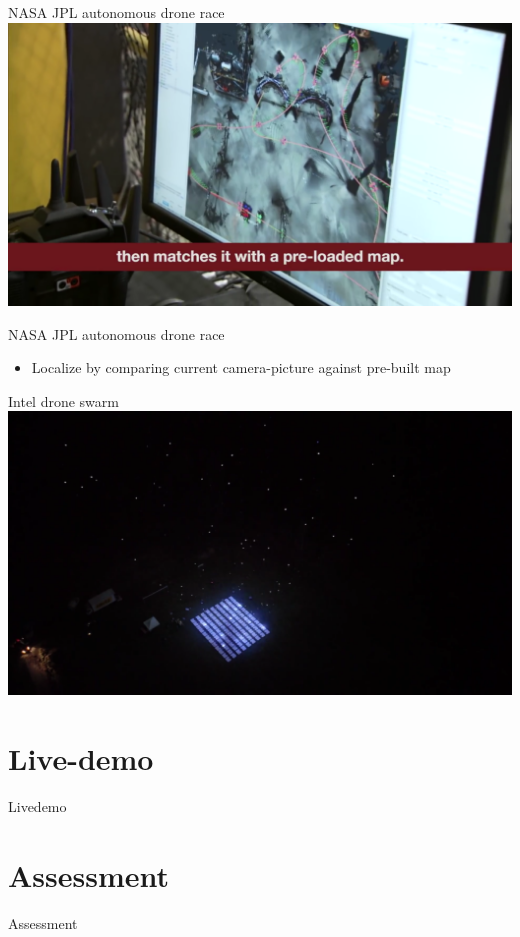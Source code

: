\documentclass[aspectratio=169]{beamer}
\begin{document}
\begin{frame}{NASA JPL autonomous drone race}
        	\centering
            \href{run:./videos/NasaAutoDrone.mp4?autostart}
            {\includegraphics[width=\linewidth]{images/nasa.png}}
\end{frame}
\begin{frame}{NASA JPL autonomous drone race}
	\begin{itemize}
		\item Localize by comparing current camera-picture against pre-built map
	\end{itemize}
	\color{gray}{https://www.nasa.gov/feature/jpl/drone-race-human-versus-artificial-intelligence}
\end{frame}


\begin{frame}{Intel drone swarm}
        	\centering
            \href{run:./videos/Intel.mp4?autostart}
            {\includegraphics[width=\linewidth]{images/intel.png}}
\end{frame}


\section{Live-demo}
\begin{frame}{Livedemo}
\end{frame}

\section{Assessment}
\begin{frame}{Assessment}
\end{frame}
\end{document}
